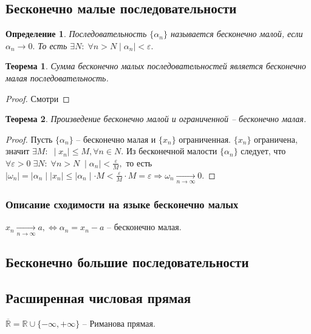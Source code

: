 \documentclass{article}
\newtheorem{Theorem}{Теорема}[section]
\newtheorem{Definition}{Определение}[section]
\begin{document}
\subsection{Бесконечно малые последовательности}
\begin{Definition}
Последовательность $\{\alpha_n\}$ называется бесконечно малой, если $\alpha_n \rightarrow 0.$ То есть $\exists N: \; \forall n>N \mid\alpha_n\mid<\varepsilon.$
\end{Definition}

\begin{Theorem}
Сумма бесконечно малых последовательностей является бесконечно малая последовательность.
\end{Theorem}
\begin{proof}
Смотри %
\end{proof}

\begin{Theorem}
Произведение бесконечно малой и ограниченной -- бесконечно малая.
\end{Theorem}
\begin{proof}
Пусть $\{\alpha_n\}$ -- бесконечно малая и $\{x_n\}$ ограниченная. $\{x_n\}$ ограничена, значит $\exists M: \; \mid x_n\mid\leq M, \forall n\in N.$ Из бесконечной малости $\{\alpha_n\}$ следует, что $\forall\varepsilon>0 \; \exists N: \; \forall n>N \; \mid\alpha_n\mid<\frac{\varepsilon}{M},$ то есть $\mid\omega_n\mid=\mid\alpha_n\mid\mid x_n\mid\leq\mid\alpha_n\mid\cdot M<\frac{\varepsilon}{M}\cdot M=\varepsilon \Rightarrow \omega_n\xrightarrow[n\rightarrow\infty]{} 0.$
\end{proof}
\subsubsection{Описание сходимости на языке бесконечно малых}
$x_n \xrightarrow[n\rightarrow\infty]{} a,  \Leftrightarrow \alpha_n=x_n-a$ -- бесконечно малая.

\subsection{Бесконечно большие последовательности}

\subsection{Расширенная числовая прямая}
$\overline{\mathbb{R}}=\mathbb{R}\cup\{-\infty, +\infty\}$ -- Риманова прямая.
\end{document}
